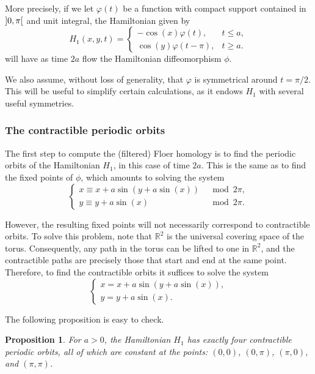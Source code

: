 \documentclass{article}
\newtheorem{prop}{Proposition}
\theoremstyle{nonumberplain}
\newcommand{\R}{\mathbb{R}}
\begin{document}
More precisely, if we let $\varphi(t)$ be a function with compact support contained in $\ointerval 0 \pi$ and unit integral, the Hamiltonian given by
\begin{equation}
H_1(x,y,t) = \begin{cases}
-\cos(x) \varphi(t), & t \leq a,\\
\cos(y) \varphi(t-\pi), & t \geq a.
\end{cases}
\end{equation}
will have as time $2a$	 flow the Hamiltonian diffeomorphism $\phi$.

We also assume, without loss of generality, that $\varphi$ is symmetrical around $t = \pi/2$. This will be useful to simplify certain calculations, as it endows $H_1$ with several useful symmetries.

\subsubsection{The contractible periodic orbits}

The first step to compute the (filtered) Floer homology is to find the periodic orbits of the Hamiltonian $H_1$, in this case of time $2a$. This is the same as to find the fixed points of $\phi$, which amounts to solving the system
\begin{equation}
\begin{cases}
x \equiv x + a \sin(y + a \sin(x)) &\mod 2\pi,\\
y \equiv y + a \sin(x) &\mod 2\pi.
\end{cases}
\end{equation}

However, the resulting fixed points will not necessarily correspond to contractible orbits. To solve this problem, note that $\R^2$ is the universal covering space of the torus. Consequently, any path in the torus can be lifted to one in $\R^2$, and the contractible paths are precisely those that start and end at the same point. Therefore, to find the contractible orbits it suffices to solve the system
\begin{equation}
\begin{cases}
x = x + a \sin(y + a \sin(x)),\\
y = y + a \sin(x).
\end{cases}
\end{equation}

The following proposition is easy to check.

\begin{prop}
For $a > 0$, the Hamiltonian $H_1$ has exactly four contractible periodic orbits, all of which are constant at the points: $(0,0)$, $(0,\pi)$, $(\pi,0)$, and $(\pi,\pi)$.
\end{prop}
\end{document}
